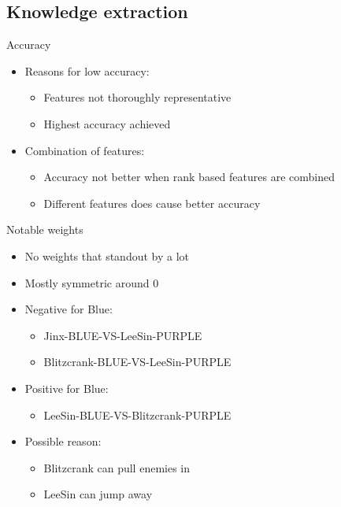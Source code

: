 \subsection{Knowledge extraction}
\label{sec-1-2}
\begin{frame}[label=sec-1-2-1]{Accuracy}
\begin{itemize}
\item Reasons for low accuracy:
\begin{itemize}
\item Features not thoroughly  representative
\item Highest accuracy achieved
\end{itemize}
\item Combination of features:
\begin{itemize}
\item Accuracy not better when rank based features are combined
\item Different features does cause better accuracy
\end{itemize}
\end{itemize}
\end{frame}

\begin{frame}[label=sec-1-2-2]{Notable weights}
\begin{itemize}
\item No weights that standout by a lot
\item Mostly symmetric around 0
\end{itemize}
\vspace{0.05}
\begin{itemize}
\item Negative for Blue:
\begin{itemize}
\item Jinx-BLUE-VS-LeeSin-PURPLE
\item Blitzcrank-BLUE-VS-LeeSin-PURPLE
\end{itemize}
\item Positive for Blue:
\begin{itemize}
\item LeeSin-BLUE-VS-Blitzcrank-PURPLE
\end{itemize}
\item Possible reason:
\begin{itemize}
\item Blitzcrank can pull enemies in
\item LeeSin can jump away
\end{itemize}
\end{itemize}
\end{frame}
